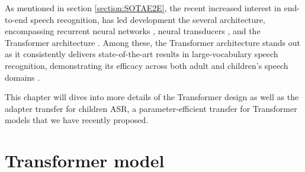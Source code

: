 As mentioned in section \ref{section:SOTAE2E}, the recent increased interest in end-to-end speech recognition, has led development the  several architecture, encompassing recurrent neural networks \cite{soltau2016neural}, neural transducers \cite{battenberg2017exploring}, and the Transformer architecture \cite{vaswani2017attention}. Among these, the Transformer architecture stands out as it consistently delivers state-of-the-art results in large-vocabulary speech recognition, demonstrating its efficacy across both adult and children's speech domains \cite{gelin2021endtoend}.

This chapter will dives into more details of the Transformer design as well as the adapter transfer for children ASR, a  parameter-efficient transfer for Transformer models that we have recently proposed.
\section{Transformer model}
\label{sec:trans_archi}

